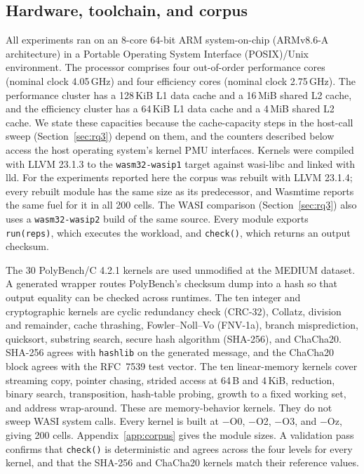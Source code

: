 \documentclass{ws-jcsc}
\begin{document}
\subsection{Hardware, toolchain, and corpus}
All experiments ran on an 8-core 64-bit ARM system-on-chip (ARMv8.6-A architecture) in a Portable Operating System Interface (POSIX)/Unix environment. The processor comprises four out-of-order performance cores (nominal clock 4.05\,GHz) and four efficiency cores (nominal clock 2.75\,GHz). The performance cluster has a 128\,KiB L1 data cache and a 16\,MiB shared L2 cache, and the efficiency cluster has a 64\,KiB L1 data cache and a 4\,MiB shared L2 cache. We state these capacities because the cache-capacity steps in the host-call sweep (Section~\ref{sec:rq3}) depend on them, and the counters described below access the host operating system's kernel PMU interfaces. Kernels were compiled with LLVM 23.1.3 to the \texttt{wasm32-wasip1} target against wasi-libc and linked with lld. For the experiments reported here the corpus was rebuilt with LLVM 23.1.4; every rebuilt module has the same size as its predecessor, and Wasmtime reports the same fuel for it in all 200 cells. The WASI comparison (Section~\ref{sec:rq3}) also uses a \texttt{wasm32-wasip2} build of the same source. Every module exports \texttt{run(reps)}, which executes the workload, and \texttt{check()}, which returns an output checksum.

The 30 PolyBench/C 4.2.1 kernels are used unmodified at the MEDIUM dataset. A generated wrapper routes PolyBench's checksum dump into a hash so that output equality can be checked across runtimes. The ten integer and cryptographic kernels are cyclic redundancy check (CRC-32), Collatz, division and remainder, cache thrashing, Fowler--Noll--Vo (FNV-1a), branch misprediction, quicksort, substring search, secure hash algorithm (SHA-256), and ChaCha20. SHA-256 agrees with \texttt{hashlib} on the generated message, and the ChaCha20 block agrees with the RFC~7539 test vector. The ten linear-memory kernels cover streaming copy, pointer chasing, strided access at 64\,B and 4\,KiB, reduction, binary search, transposition, hash-table probing, growth to a fixed working set, and address wrap-around. These are memory-behavior kernels. They do not sweep WASI system calls. Every kernel is built at $-$O0, $-$O2, $-$O3, and $-$Oz, giving 200 cells. Appendix~\ref{app:corpus} gives the module sizes. A validation pass confirms that \texttt{check()} is deterministic and agrees across the four levels for every kernel, and that the SHA-256 and ChaCha20 kernels match their reference values.
\end{document}
